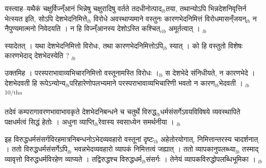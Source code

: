 \documentclass[article,12pt,a4paper]{memoir}%
\newcounter{parCount}
\begin{document}
	  \pstart \leavevmode%
	यस्त्वाह--यथैकं चक्षुर्विज्न्ँआनं भिन्नेषु चक्षुरादिषु वर्तते तदधीनोत्पाद{\tiny $_{lb}$}तया, तथान्योऽपि भिन्नदेशनिवृत्तिर्न भेत्स्यत इति, सोऽपि देशभेदनिमित्ते{\tiny $_{lb}$} विरोधे अवस्थाप्यमाने वस्तुनः कारणभेदनिमित्तं विरोधमासन्ँजयन्{\tiny $_{lb}$} न नैपुण्यमात्मनो निवेदयति । न हि विज्न्ँआनस्य देशोऽस्ति कश्चित्,{\tiny $_{lb}$} अमूर्तत्वात् ।
	{}
	\pend%
      {\tiny $_{lb}$}

	  \pstart \leavevmode%
	स्यादेतत् । यथा देशभेदनिमित्तो विरोधः, तथा कारणभेदनिमित्तोऽपि{\tiny $_{lb}$} स्यात् । को हि वस्तुतो विशेषः कारणभेदाद् देशभेदस्येति ?
	{}
	\pend%
      {\tiny $_{lb}$}

	  \pstart \leavevmode%
	उक्तमिह । परस्पराभावाव्यभिचारनिमित्तो वस्तूनामस्ति विरोधः ।{\tiny $_{lb}$} स देशभेदे संनिधीयते, न कारणभेदे । देशभेदवती हि रूपेऽन्योन्य{\tiny $_{lb}$}परिहारेणोपलभ्यमाने परस्पराभावाव्यभिचारिणी भवतो न कारण{\tiny $_{lb}$}भेदवती ।
	{}
	\pend%
      {\tiny $_{lb}$}\textsuperscript{\textenglish{10/tha}}

	  \pstart \leavevmode%
	तदेवं कम्परागावरणभावाभावकृते देशभेदनिबन्धने च चतुर्थे विरुद्ध{\tiny $_{lb}$}धर्मसंसर्गेऽवयविविषये व्यवस्थापिते पक्षधर्मत्वं सिद्धं हेतोः । अधुना व्याप्ति{\tiny $_{lb}$}रेवास्य स्वसाध्येन समर्थनीया ।
	{}
	\pend%
      {\tiny $_{lb}$}

	  \pstart \leavevmode%
	इह विरुद्धधर्मसंसर्गविरहमात्रनिबन्धनोऽभेदव्यवहारो वस्तूनां दृष्टः{\tiny $_{lb}$} अहेतोरयोगात्, निमित्तान्तरस्य चादर्शनात् । ततो विरुद्धधर्मसंसर्गेऽपि{\tiny $_{lb}$} भवन्नभेदव्यवहारो व्यापकं निमित्तत्वं जह्यात् । ततो व्यापकानुपलब्ध्या{\tiny $_{lb}$} तस्माद् व्यावृत्तो विरुद्धधर्मविरहेण व्याप्यते । तद्विरुद्धश्च विरुद्धधर्म{\tiny $_{lb}$}संसर्गः । तेनेयं व्यापकविरुद्धोपलब्धिभूमिका ।
	{}
	\pend%
      {\tiny $_{lb}$}
\end{document}

